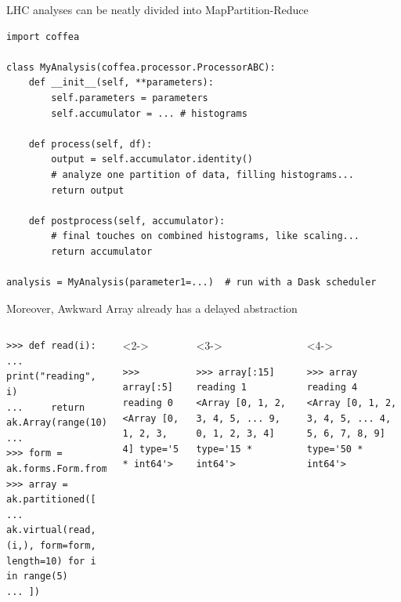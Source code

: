 \documentclass[aspectratio=169]{beamer}
\begin{document}
\begin{frame}[fragile]{LHC analyses can be neatly divided into MapPartition-Reduce}
\vspace{0.25 cm}
\small
\begin{verbatim}
import coffea

class MyAnalysis(coffea.processor.ProcessorABC):
    def __init__(self, **parameters):
        self.parameters = parameters
        self.accumulator = ... # histograms

    def process(self, df):
        output = self.accumulator.identity()
        # analyze one partition of data, filling histograms...
        return output

    def postprocess(self, accumulator):
        # final touches on combined histograms, like scaling...
        return accumulator

analysis = MyAnalysis(parameter1=...)  # run with a Dask scheduler
\end{verbatim}
\end{frame}

\begin{frame}[fragile]{Moreover, Awkward Array already has a delayed abstraction}
\small
\begin{columns}
\begin{verbatim}
>>> def read(i):
...     print("reading", i)
...     return ak.Array(range(10))
... 
>>> form = ak.forms.Form.from_numpy(np.dtype(np.int64))
>>> array = ak.partitioned([
...     ak.virtual(read, (i,), form=form, length=10) for i in range(5)
... ])
\end{verbatim}
\vspace{-0.3 cm}
\begin{uncoverenv}<2->
\begin{verbatim}
>>> array[:5]
reading 0
<Array [0, 1, 2, 3, 4] type='5 * int64'>
\end{verbatim}
\end{uncoverenv}
\begin{uncoverenv}<3->
\vspace{-0.3 cm}
\begin{verbatim}
>>> array[:15]
reading 1
<Array [0, 1, 2, 3, 4, 5, ... 9, 0, 1, 2, 3, 4] type='15 * int64'>
\end{verbatim}
\end{uncoverenv}
\vspace{-0.3 cm}
\begin{uncoverenv}<4->
\begin{verbatim}
>>> array
reading 4
<Array [0, 1, 2, 3, 4, 5, ... 4, 5, 6, 7, 8, 9] type='50 * int64'>
\end{verbatim}
\end{uncoverenv}
\end{columns}
\end{frame}
\end{document}

